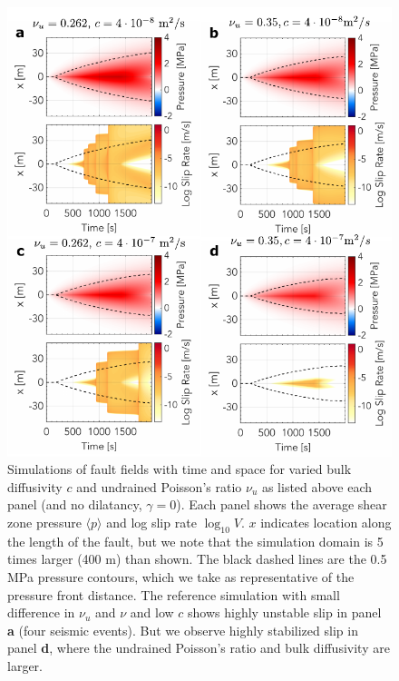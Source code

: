 \documentclass[draft]{agujournal2019}
\begin{document}
\begin{figure}[H]
\centering
\includegraphics[scale = 0.95]{Figures/gamma0_comparison.pdf} %
\caption{Simulations of fault fields with time and space for varied bulk diffusivity $c$ and undrained Poisson's ratio $\nu_u$ as listed above each panel (and no dilatancy, $\gamma = 0$). Each panel shows the average shear zone pressure $\langle p \rangle$ and log slip rate  $\log_{10}{V}$. $x$ indicates location along the length of the fault, but we note that the simulation domain is 5 times larger (400 m) than shown. The black dashed lines are the 0.5 MPa pressure contours, which we take as representative of the pressure front distance. The reference simulation with small difference in $\nu_u$ and $\nu$ and low $c$ shows highly unstable slip in panel {\bf a} (four seismic events). But we observe highly stabilized slip in panel {\bf d}, where the undrained Poisson's ratio and bulk diffusivity are larger.}
\label{fig:Appg0}
\end{figure}
\end{document}
